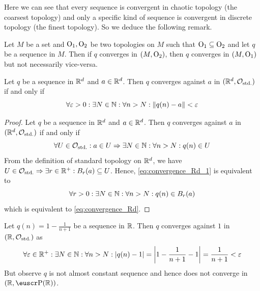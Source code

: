 Here we can see that every sequence is convergent in chaotic topology (the coarsest topology) and only a specific kind of sequence is convergent in discrete topology (the finest topology). So we deduce the following remark.

\begin{remark}\label{rem:convergence_in_comparison_topologies}
	Let \(M\) be a set and \(\mathrm{O}_1, \mathrm{O}_2\) be two topologies on \(M\) such that \(\mathrm{O}_1 \subseteq \mathrm{O}_2\) and let \(q\) be a sequence in \(M\). Then if \(q\) converges in \((M, \mathrm{O}_2)\), then \(q\) converges in \((M, \mathrm{O}_1)\) but not necessarily vice-versa.
\end{remark}

\begin{theorem}
	Let \(q\) be a sequence in \(\mathbb R^d\) and \(a \in \mathbb R^d\). Then \(q\) converges against \(a\) in \((\mathbb R^d, \mathcal{O}_{\text{std.}})\) if and only if
	\begin{equation}
		\forall \varepsilon > 0: \exists N \in \mathbb N: \forall n > N: \norm{q(n) - a} < \varepsilon \label{eq:convergence_Rd}
	\end{equation}
\end{theorem}

\begin{proof}
	Let \(q\) be a sequence in \(\mathbb R^d\) and \(a \in \mathbb R^d\). Then \(q\) converges against \(a\) in \((\mathbb R^d, \mathcal{O}_{\text{std.}})\) if and only if
	\begin{equation}
		\forall U \in \mathcal{O}_{\text{std.}}: a \in U \Rightarrow \exists N \in \mathbb N: \forall n > N: q(n) \in U \label{eq:convergence_Rd_1}
	\end{equation}
	From the definition of standard topology on \(\mathbb R^d\), we have \(U \in \mathcal{O}_{\text{std.}} \Rightarrow \exists r \in \mathbb R^+: B_r(a) \subseteq U\). Hence, \eqref{eq:convergence_Rd_1} is equivalent to
	\begin{equation}
		\forall r > 0: \exists N \in \mathbb N: \forall n > N: q(n) \in B_r(a) \label{eq:convergence_Rd_2}
	\end{equation}
	which is equivalent to \eqref{eq:convergence_Rd}.
\end{proof}

\begin{example}[Convergence in \(\R\)]
	Let \(q(n) = 1 - \frac{1}{n + 1}\) be a sequence in \(\R\). Then \(q\) converges against \(1\) in \((\mathbb R, \mathcal{O}_{\text{std.}})\) as
	\begin{equation*}
		\forall \varepsilon \in \mathbb R^+: \exists N \in \mathbb N: \forall n > N: \abs{q(n) - 1} = \abs{1 - \frac{1}{n + 1} - 1} = \frac{1}{n + 1} < \varepsilon
	\end{equation*}
	But observe \(q\) is not almost constant sequence and hence does not converge in \((\R, \powerset(\R))\).
\end{example}

